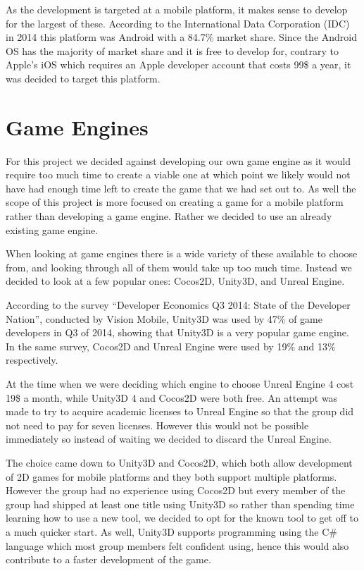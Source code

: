 As the development is targeted at a mobile platform, it makes sense to develop for the largest of these. 
According to the International Data Corporation (IDC) in 2014 this platform was Android with a 84.7\% market share\cite{marketshare}.
Since the Android OS has the majority of market share and it is free to develop for, contrary to Apple's iOS which requires an Apple developer account that costs 99\$ a year\cite{appledevprogram}, it was decided to target this platform.


\section{Game Engines}
For this project we decided against developing our own game engine as it would require too much time to create a viable one at which point we likely would not have had enough time left to create the game that we had set out to. 
As well the scope of this project is more focused on creating a game for a mobile platform rather than developing a game engine.
Rather we decided to use an already existing game engine.

When looking at game engines there is a wide variety of these available to choose from, and looking through all of them would take up too much time. 
Instead we decided to look at a few popular ones: Cocos2D, Unity3D, and Unreal Engine.

According to the survey ``Developer Economics Q3 2014: State of the Developer Nation''\cite{visionmobile-survey}, conducted by Vision Mobile\cite{visionmobile}, Unity3D was used by 47\% of game developers in Q3 of 2014, showing that Unity3D is a very popular game engine. 
In the same survey, Cocos2D and Unreal Engine were used by 19\% and 13\% respectively.

At the time when we were deciding which engine to choose Unreal Engine 4 cost 19\$ a month, while Unity3D 4 and Cocos2D were both free. 
An attempt was made to try to acquire academic licenses to Unreal Engine so that the group did not need to pay for seven licenses. 
However this would not be possible immediately so instead of waiting we decided to discard the Unreal Engine.

The choice came down to Unity3D and Cocos2D, which both allow development of 2D games for mobile platforms and they both support multiple platforms. 
However the group had no experience using Cocos2D but every member of the group had shipped at least one title using Unity3D so rather than spending time learning how to use a new tool, we decided to opt for the known tool to get off to a much quicker start. 
As well, Unity3D supports programming using the C\# language which most group members felt confident using, hence this would also contribute to a faster development of the game.